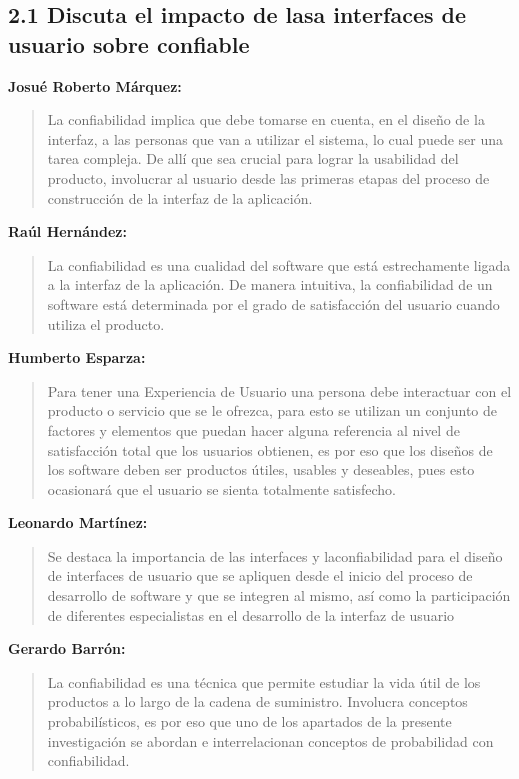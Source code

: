 \documentclass{article}
\begin{document}
\subsection*{2.1 Discuta el impacto de lasa interfaces de usuario sobre confiable }


\textbf{Josué Roberto Márquez:}
\begin {quote}


La confiabilidad implica que debe tomarse en cuenta, en el diseño de la interfaz, a las personas que
van a utilizar el sistema, lo cual puede ser una tarea compleja. De allí que sea crucial para lograr
la usabilidad del producto, involucrar al usuario desde las primeras etapas del proceso de
construcción de la interfaz de la aplicación. 

\end {quote}


\textbf{Raúl Hernández:}


\begin {quote}
La confiabilidad es una cualidad del software que está estrechamente ligada a la interfaz de la
aplicación. De manera intuitiva, la confiabilidad de un software está determinada por el grado de
satisfacción del usuario cuando utiliza el producto.

\end {quote}

\textbf{Humberto Esparza:}


\begin {quote}
Para tener una Experiencia de Usuario una persona debe interactuar con el producto o servicio que se le ofrezca, para esto se utilizan un conjunto de factores y elementos que puedan hacer alguna referencia al nivel de satisfacción total que los usuarios obtienen, es por eso que los diseños de los software deben ser productos útiles, usables y deseables, pues esto ocasionará que el usuario se sienta totalmente satisfecho.

\end {quote}

\textbf{Leonardo Martínez:}


\begin {quote}
Se destaca la importancia de las interfaces y laconfiabilidad para el
diseño de interfaces de usuario que se apliquen desde el inicio del proceso de desarrollo de
software y que se integren al mismo, así como la participación de diferentes especialistas en el
desarrollo de la interfaz de usuario
\end {quote}


\textbf{Gerardo Barrón:}


\begin {quote}
La confiabilidad es una técnica que permite estudiar la vida útil de los productos a lo largo de la cadena de suministro.
Involucra conceptos probabilísticos, es por eso que uno de los apartados de la presente investigación se abordan e interrelacionan conceptos de probabilidad con confiabilidad. 



\end {quote}
\end{document}

